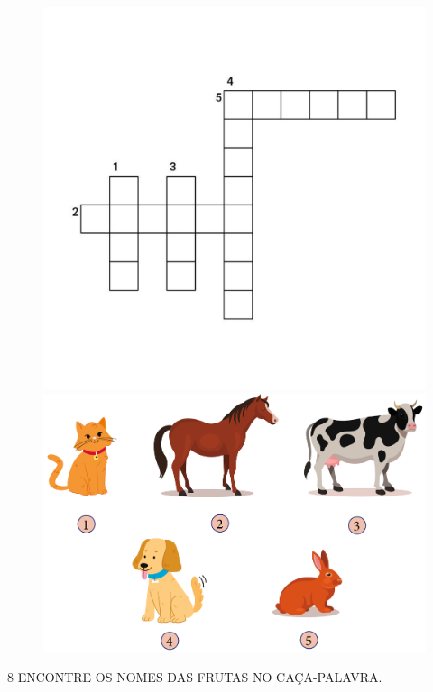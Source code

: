\begin{figure}[H]
\centering\includegraphics[width=.9\textwidth]{media/image90.png}

\vspace{0.5cm}

\centering\includegraphics[width=.8\textwidth]{media/image90b.png}
\end{figure}


\pagebreak
\num{8} ENCONTRE OS NOMES DAS FRUTAS NO CAÇA-PALAVRA.


